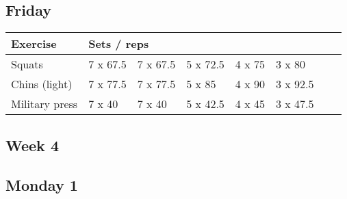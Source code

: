 \documentclass[12pt, a4paper]{article}%
\begin{document}
  \subsection*{\hspace{0.5em} Friday }


  \begin{tabular}{l|lllllll}
  \hspace{0.75em} \textbf{Exercise} & \multicolumn{ 7 }{l}{ \textbf{Sets / reps} } \\ \hline

            \hspace{0.75em} Squats
            & 7 x 67.5
            & 7 x 67.5
            & 5 x 72.5
            & 4 x 75
            & 3 x 80
            & 
            & 
            \\


            \hspace{0.75em} Chins (light)
            & 7 x 77.5
            & 7 x 77.5
            & 5 x 85
            & 4 x 90
            & 3 x 92.5
            & 
            & 
            \\


            \hspace{0.75em} Military press
            & 7 x 40
            & 7 x 40
            & 5 x 42.5
            & 4 x 45
            & 3 x 47.5
            & 
            & 
            \\


  \end{tabular}


\clearpage \subsection*{\hspace{0.25em} Week 4 }
  \subsection*{\hspace{0.5em} Monday 1 }
\end{document}
